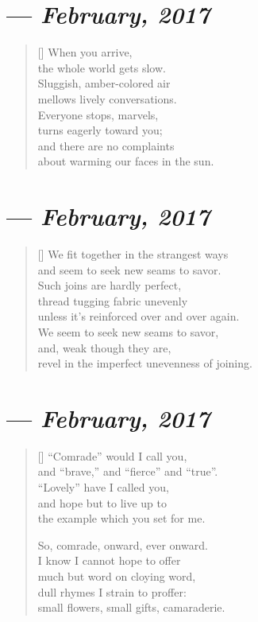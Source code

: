 \section{--- \textit{February, 2017}}

\begin{verse}[\textwidth]
  When you arrive,\\
  the whole world gets slow.\\
  Sluggish, amber-colored air\\
  mellows lively conversations.\\
  Everyone stops, marvels,\\
  turns eagerly toward you;\\
  and there are no complaints\\
  about warming our faces in the sun.
\end{verse}
\newpage

\section{--- \textit{February, 2017}}

\begin{verse}[\textwidth]
  We fit together in the strangest ways\\
  and seem to seek new seams to savor.\\
  Such joins are hardly perfect,\\
  thread tugging fabric unevenly\\
  unless it's reinforced over and over again.\\
  We seem to seek new seams to savor,\\
  and, weak though they are,\\
  revel in the imperfect unevenness of joining.
\end{verse}
\newpage

\section{--- \textit{February, 2017}}

\begin{verse}[\textwidth]
  ``Comrade'' would I call you,\\
  and ``brave,'' and ``fierce'' and ``true''.\\
  ``Lovely'' have I called you,\\
  and hope but to live up to\\
  the example which you set for me.

  So, comrade, onward, ever onward.\\
  I know I cannot hope to offer\\
  much but word on cloying word,\\
  dull rhymes I strain to proffer:\\
  small flowers, small gifts, camaraderie.
\end{verse}
\newpage

